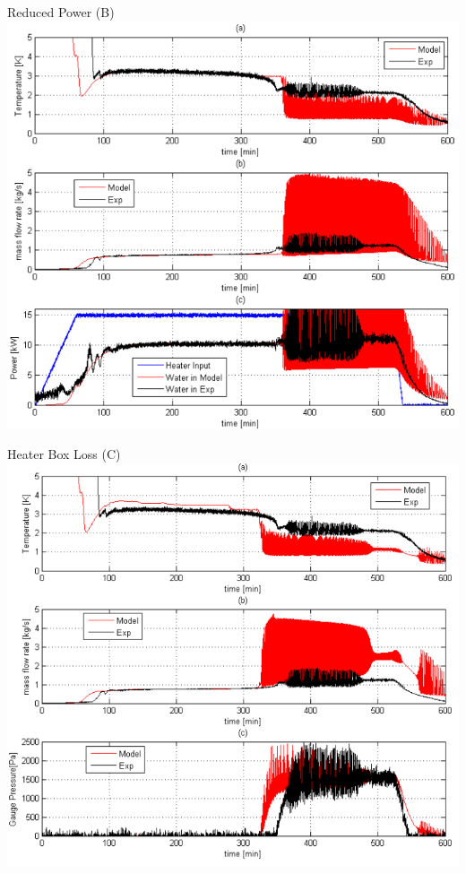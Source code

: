 \documentclass[10pt,t,xcolor=table]{UWMadBeamer}
\begin{document}
\begin{frame}{Reduced Power (B)}
    \centering
    \includegraphics[height=0.77\paperheight]{Comparison_Reduced}
\end{frame}


\begin{frame}{Heater Box Loss  (C)}
    \centering
    \includegraphics[height=0.77\paperheight]{Comparison_HeaterBoxLoss}
\end{frame}
\end{document}
